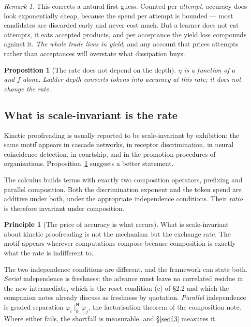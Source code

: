 \documentclass[11pt]{article}
\theoremstyle{plain}
\newtheorem{proposition}[theorem]{Proposition}
\theoremstyle{definition}
\newtheorem{principle}[theorem]{Principle}
\theoremstyle{remark}
\newtheorem{remark}[theorem]{Remark}
\begin{document}
\begin{remark}
This corrects a natural first guess. Counted per \emph{attempt}, accuracy does
look exponentially cheap, because the spend per attempt is bounded --- most
candidates are discarded early and never cost much. But a learner does not
eat attempts, it eats accepted products, and per acceptance the yield loss
compounds against it. \emph{The whole trade lives in yield}, and any account
that prices attempts rather than acceptances will overstate what dissipation
buys.
\end{remark}

\begin{proposition}[The rate does not depend on the depth]
\label{prop:depthfree}
$\eta$ is a function of $a$ and $f$ alone. Ladder depth converts tokens into
accuracy at this rate; it does not change the rate.
\end{proposition}

\subsection{What is scale-invariant is the rate}
\label{sec:scale}

Kinetic proofreading is usually reported to be scale-invariant by exhibition:
the same motif appears in cascade networks, in receptor discrimination, in
neural coincidence detection, in courtship, and in the promotion procedures of
organisations. Proposition~\ref{prop:depthfree} suggests a better statement.

The calculus builds terms with exactly two composition operators, prefixing
and parallel composition. Both the discrimination exponent and the token
spend are additive under both, under the appropriate independence conditions.
Their \emph{ratio} is therefore invariant under composition.

\begin{principle}[The price of accuracy is what recurs]
What is scale-invariant about kinetic proofreading is not the mechanism but
the exchange rate. The motif appears wherever computations compose because
composition is exactly what the rate is indifferent to.
\end{principle}

The two independence conditions are different, and the framework can state
both. \emph{Serial} independence is freshness: the advance must leave no
correlated residue in the new intermediate, which is the reset condition (c)
of \S2.2 and which the companion notes already discuss as freshness by
quotation. \emph{Parallel} independence is graded separation
$\varphi_i \mid_0^{\mathsf{N}} \varphi_j$, the factorisation theorem of the
composition note. Where either fails, the shortfall is measurable, and
\S\ref{sec:l3} measures it.
\end{document}
